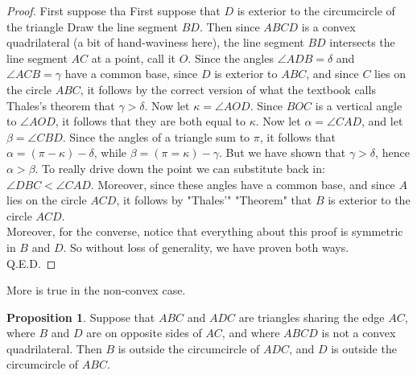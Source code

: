 \documentclass[12pt]{article}
\theoremstyle{definition}
\newtheorem{proposition}{Proposition}
\begin{document}
\begin{proof}

First suppose tha
First suppose that $D$ is exterior to the circumcircle of the triangle 
Draw the line segment $BD$. Then since $ABCD$ is a convex quadrilateral (a bit of hand-waviness here), the line segment $BD$ intersects the line segment $AC$ at a point, call it $O$. Since the angles $\angle ADB = \delta$ and $\angle ACB = \gamma$ have a common base, since $D$ is exterior to $ABC$, and since $C$ lies on the circle $ABC$, it follows by the correct version of what the textbook calls Thales's theorem that $ \gamma > \delta $. Now let $ \kappa = \angle AOD$. Since $BOC$ is a vertical angle to $\angle AOD$, it follows that they are both equal to $\kappa$. Now let $\alpha = \angle CAD$, and let $\beta = \angle CBD$. Since the angles of a triangle sum to $\pi$, it follows that $\alpha = (\pi - \kappa)- \delta$, while $\beta = (\pi = \kappa) - \gamma$. But we have shown that $\gamma  > \delta$, hence $\alpha  > \beta$. To really drive down the  point we can substitute back in: $\angle DBC < \angle CAD$. Moreover, since these angles have a common base, and since $A $ lies on the circle $ACD$, it follows by "Thales'" "Theorem" that $B$ is exterior to the circle $ACD$. \\
Moreover, for the converse, notice that everything about this proof is symmetric in $B$ and $D$. So without loss of generality, we have proven both ways.\\

Q.E.D.
\end{proof}

More is true in the non-convex case. 

\begin{proposition}
Suppose that $ABC$ and $ADC$ are triangles sharing the edge $AC$, where $B$ and $D$ are on opposite sides of $AC$, and where $ABCD$ is not a convex quadrilateral. Then $B$ is outside the circumcircle of $ADC$, and $D$ is outside the circumcircle of $ABC$.
\end{proposition}
\end{document}

